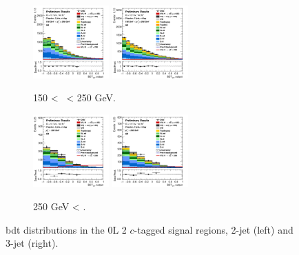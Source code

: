 \vspace*{\fill}

\begin{figure}[h!]
    \centering
    \begin{subfigure}[b]{\textwidth}
        \centering
        \includegraphics[width=0.32\textwidth]{Images/VH/Own_fit/postfit_VHcc/Region_distmva_BMax250_BMin150_DSR_J2_TTypext_T2_L0_Y6051_GlobalFit_conditionnal_mu1.png}
        \includegraphics[width=0.32\textwidth]{Images/VH/Own_fit/postfit_VHcc/Region_distmva_BMax250_BMin150_DSR_J3_TTypext_T2_L0_Y6051_GlobalFit_conditionnal_mu1.png}
        \caption{150 < \ptv\ < 250 GeV.}
        \label{fig:plots_VHcc_OL_150_SR_2c}
    \end{subfigure}
    \begin{subfigure}[b]{\textwidth}
        \centering
        \includegraphics[width=0.32\textwidth]{Images/VH/Own_fit/postfit_VHcc/Region_distmva_BMin250_DSR_J2_TTypext_T2_L0_Y6051_GlobalFit_conditionnal_mu1.png}
        \includegraphics[width=0.32\textwidth]{Images/VH/Own_fit/postfit_VHcc/Region_distmva_BMin250_DSR_J3_TTypext_T2_L0_Y6051_GlobalFit_conditionnal_mu1.png}
        \caption{250 GeV < \ptv.}
        \label{fig:plots_VHcc_OL_250_SR_2c}
    \end{subfigure}
    \caption{\gls{bdt} distributions in the 0L 2 $c$-tagged signal regions, 2-jet (left) and 3-jet (right).}
    \label{fig:plots_VHcc_OL_SR_2c}
\end{figure} 
